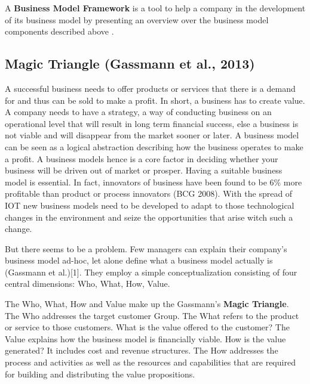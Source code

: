 	 A \textbf{Business Model Framework} is a tool to help a company in the development of its business model by presenting an overview over the business model components described above \cite{dijkman}.

	\subsection{Magic Triangle (Gassmann et al., 2013)}
	A successful business needs to offer products or services that there is a demand for and thus can be sold to make a profit. In short, a business has to create value. A company needs to have a strategy, a way of conducting business on an operational level that will result in long term financial success, else a business is not viable and will disappear from the market sooner or later.
	A business model can be seen as a logical abstraction describing how the business operates to make a profit. A business models hence is a core factor in deciding whether your business will be driven out of market or prosper. Having a suitable business model is essential. In fact, innovators of business have been found to be 6\% more profitable than product or process innovators (BCG 2008). With the spread of IOT new business models need to be developed to adapt to those technological changes in the environment and seize the opportunities that arise witch such a change. 

	But there seems to be a problem. Few managers can explain their company's business model ad-hoc, let alone define what a business model actually is (Gassmann et al.)[1]. They employ a simple conceptualization consisting of four central dimensions: Who, What, How, Value. 

	The Who, What, How and Value make up the Gassmann's \textbf{Magic Triangle}. The Who addresses the target customer Group. The What refers to the product or service to those customers. What is the value offered to the customer? The Value explains how the business model is financially viable. How is the value generated? It includes cost and revenue structures. The How addresses the process and activities as well as the resources and capabilities that are required for building and distributing the value propositions.		
				
